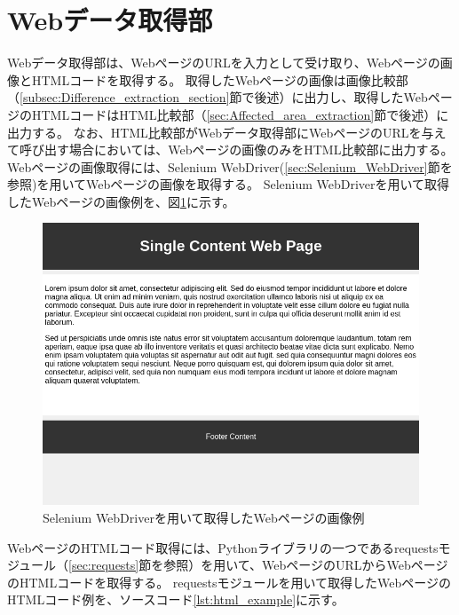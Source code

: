 \section{Webデータ取得部}\label{sec:Web_data_get_section}
Webデータ取得部は、WebページのURLを入力として受け取り、Webページの画像とHTMLコードを取得する。
取得したWebページの画像は画像比較部（\ref{subsec:Difference_extraction_section}節で後述）に出力し、取得したWebページのHTMLコードはHTML比較部（\ref{sec:Affected_area_extraction}節で後述）に出力する。
なお、HTML比較部がWebデータ取得部にWebページのURLを与えて呼び出す場合においては、Webページの画像のみをHTML比較部に出力する。
Webページの画像取得には、Selenium WebDriver(\ref{sec:Selenium_WebDriver}節を参照)を用いてWebページの画像を取得する。
Selenium WebDriverを用いて取得したWebページの画像例を、図\ref{fig:4_get_images}に示す。
\begin{figure}[tp]
    \begin{center}
        \includegraphics[width=1.0\columnwidth]{image/4_get_images.png}
        \caption{Selenium WebDriverを用いて取得したWebページの画像例}
        \label{fig:4_get_images}
    \end{center}
\end{figure}
WebページのHTMLコード取得には、Pythonライブラリの一つであるrequestsモジュール（\ref{sec:requests}節を参照）を用いて、WebページのURLからWebページのHTMLコードを取得する。
requestsモジュールを用いて取得したWebページのHTMLコード例を、ソースコード\ref{lst:html_example}に示す。
